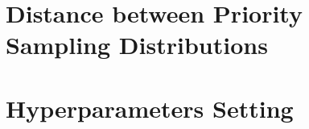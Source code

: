 \begin{algorithm}[H]
\begin{algorithmic}[1]
        

    \EndIf
\EndFor
\end{algorithmic}
\end{algorithm}

\section{Distance between Priority Sampling Distributions}


\section{Hyperparameters Setting}
\label{append:hyperparameters}


